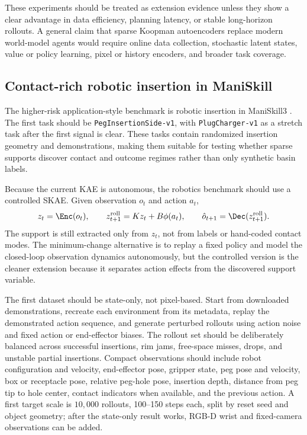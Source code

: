 These experiments should be treated as extension evidence unless they show a clear advantage in data efficiency, planning latency, or stable long-horizon rollouts. A general claim that sparse Koopman autoencoders replace modern world-model agents would require online data collection, stochastic latent states, value or policy learning, pixel or history encoders, and broader task coverage.

\subsection{Contact-rich robotic insertion in ManiSkill}
\label{app:maniskill_insertion}

The higher-risk application-style benchmark is robotic insertion in ManiSkill3 \citep{tao_maniskill3_2024}. The first task should be \texttt{PegInsertionSide-v1}, with \texttt{PlugCharger-v1} as a stretch task after the first signal is clear. These tasks contain randomized insertion geometry and demonstrations, making them suitable for testing whether sparse supports discover contact and outcome regimes rather than only synthetic basin labels.

Because the current KAE is autonomous, the robotics benchmark should use a controlled SKAE. Given observation \(o_t\) and action \(a_t\),
\begin{equation}
  z_t=\Enc(o_t),\qquad
  z_{t+1}^{\rm roll}=Kz_t+B\phi(a_t),\qquad
  \hat o_{t+1}=\Dec(z_{t+1}^{\rm roll}).
  \label{eq:controlled_skae}
\end{equation}
The support is still extracted only from \(z_t\), not from labels or hand-coded contact modes. The minimum-change alternative is to replay a fixed policy and model the closed-loop observation dynamics autonomously, but the controlled version is the cleaner extension because it separates action effects from the discovered support variable.

The first dataset should be state-only, not pixel-based. Start from downloaded demonstrations, recreate each environment from its metadata, replay the demonstrated action sequence, and generate perturbed rollouts using action noise and fixed action or end-effector biases. The rollout set should be deliberately balanced across successful insertions, rim jams, free-space misses, drops, and unstable partial insertions. Compact observations should include robot configuration and velocity, end-effector pose, gripper state, peg pose and velocity, box or receptacle pose, relative peg-hole pose, insertion depth, distance from peg tip to hole center, contact indicators when available, and the previous action. A first target scale is \(10{,}000\) rollouts, 100--150 steps each, split by reset seed and object geometry; after the state-only result works, RGB-D wrist and fixed-camera observations can be added.


